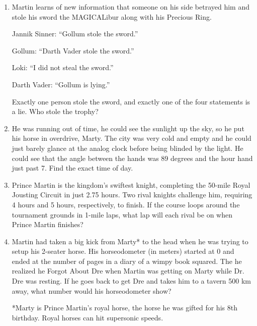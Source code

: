 \documentclass[11pt]{article}
\begin{document}
\begin{enumerate}[itemsep=1.5em]
\item Martin learns of new information that someone on his side betrayed him and stole his sword the MAGICALibur along with his Precious Ring.

Jannik Sinner: ``Gollum stole the sword.''

Gollum: ``Darth Vader stole the sword.''

Loki: ``I did not steal the sword.''

Darth Vader: ``Gollum is lying.''

Exactly one person stole the sword, and exactly one of the four statements is a lie. Who stole the trophy?

\item He was running out of time, he could see the sunlight up the sky, so he put his horse in overdrive, Marty. The city was very cold and empty and he could just barely glance at the analog clock before being blinded by the light. He could see that the angle between the hands was 89 degrees and the hour hand just past 7. Find the exact time of day.

\item Prince Martin is the kingdom's swiftest knight, completing the 50-mile Royal Jousting Circuit in just 2.75 hours. Two rival knights challenge him, requiring 4 hours and 5 hours, respectively, to finish. If the course loops around the tournament grounds in 1-mile laps, what lap will each rival be on when Prince Martin finishes?

\item Martin had taken a big kick from Marty* to the head when he was trying to setup his 2-seater horse. His horseodometer (in meters) started at 0 and ended at the number of pages in a diary of a wimpy book squared. The he realized he Forgot About Dre when Martin was getting on Marty while Dr. Dre was resting. If he goes back to get Dre and takes him to a tavern 500 km away, what number would his horseodometer show?

*Marty is Prince Martin's royal horse, the horse he was gifted for his 8th birthday. Royal horses can hit supersonic speeds.
\end{enumerate}
\end{document}
